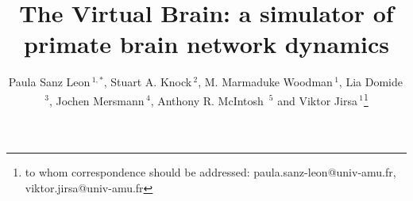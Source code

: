 \documentclass{bioinfo}
\begin{document}

\title[TVB]{The Virtual Brain: a simulator of primate brain network dynamics}
\author[Sanz Leon {et~al}]{Paula Sanz Leon\,$^{1,*}$,
        Stuart A. Knock\,$^{2}$, 
        M. Marmaduke Woodman\,$^{1}$,
        Lia Domide\,$^{3}$, 
        Jochen Mersmann\,$^{4}$,
        Anthony R. McIntosh \,$^{5}$ and  
        Viktor Jirsa\,$^{1}$\footnote{to whom correspondence should be addressed: paula.sanz-leon@univ-amu.fr, 
        viktor.jirsa@univ-amu.fr}}

\address{$^{1}$ Institut de Neurosciences des Syst{\`e}mes, 27, Bd. Jean Moulin, 13005, Marseille, France.\\
         $^{2}$ BrainModes Group, Department of Neurology, Charit{\'e} University of Medicine, Berlin, Germany.\\
         $^{3}$ Codemart, 13, Petofi Sandor, 400610, Cluj-Napoca, Romania.\\
         $^{4}$ CodeBox GmbH, Hugo Eckener Str. 7, 70184 Stuttgart, Germany.\\
         $^{5}$ Rotman Research Institute at Baycrest, Toronto, M6A 2E1, Ontario, Canada\\
        }

\history{}

\editor{}

\maketitle

\end{document}
